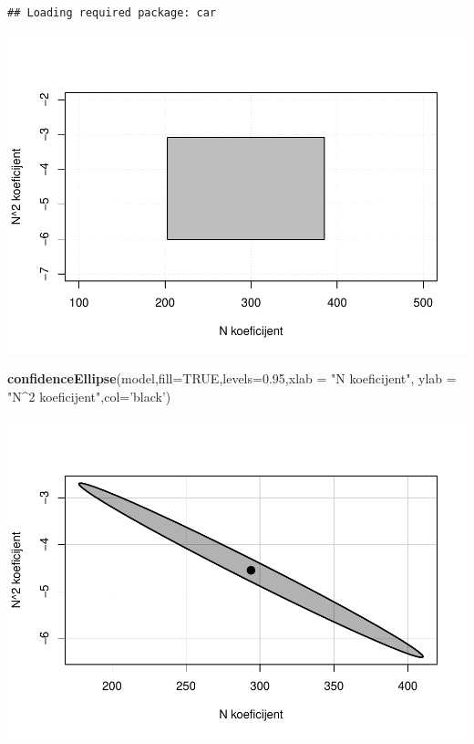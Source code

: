 \documentclass[]{article}
\newenvironment{Shaded}{\begin{snugshade}}{\end{snugshade}}
\newcommand{\KeywordTok}[1]{\textcolor[rgb]{0.13,0.29,0.53}{\textbf{{#1}}}}
\newcommand{\DataTypeTok}[1]{\textcolor[rgb]{0.13,0.29,0.53}{{#1}}}
\newcommand{\FloatTok}[1]{\textcolor[rgb]{0.00,0.00,0.81}{{#1}}}
\newcommand{\StringTok}[1]{\textcolor[rgb]{0.31,0.60,0.02}{{#1}}}
\newcommand{\OtherTok}[1]{\textcolor[rgb]{0.56,0.35,0.01}{{#1}}}
\newcommand{\NormalTok}[1]{{#1}}
\begin{document}
\begin{verbatim}
## Loading required package: car
\end{verbatim}

\includegraphics{Izvjestaj_files/figure-latex/unnamed-chunk-23-1.pdf}

\begin{Shaded}
\begin{Highlighting}[]
\KeywordTok{confidenceEllipse}\NormalTok{(model,}\DataTypeTok{fill=}\OtherTok{TRUE}\NormalTok{,}\DataTypeTok{levels=}\FloatTok{0.95}\NormalTok{,}\DataTypeTok{xlab =} \StringTok{"N koeficijent"}\NormalTok{, }\DataTypeTok{ylab =} \StringTok{"N^2 koeficijent"}\NormalTok{,}\DataTypeTok{col=}\StringTok{'black'}\NormalTok{)}
\end{Highlighting}
\end{Shaded}

\includegraphics{Izvjestaj_files/figure-latex/unnamed-chunk-23-2.pdf}
\end{document}
